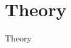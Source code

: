 \documentclass[../main.tex]{subfiles}
\begin{document}
\section{Theory}\label{sec:theory}
  Theory
\end{document}
